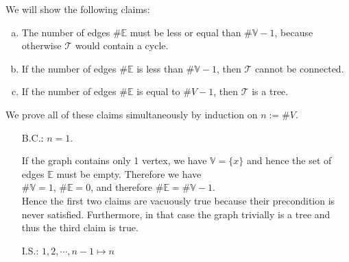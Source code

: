 \proof
We will show the following claims:
\begin{enumerate}[(a)]
\item The number of edges $\# \mathbb{E}$ must be less or equal than $\#\mathbb{V}-1$, because otherwise $\mathcal{T}$ would contain a cycle.
\item If the number of edges $\# \mathbb{E}$ is less than  $\#\mathbb{V}-1$, then $\mathcal{T}$ cannot be connected.
\item If the number of edges $\# \mathbb{E}$ is equal to $\#V - 1$, then $\mathcal{T}$ is a tree.
\end{enumerate}
We prove all of these claims simultaneously by induction on $n := \#V$.
\begin{enumerate}
\item[B.C.:] $n = 1$.

  If the graph contains only 1 vertex, we have $\mathbb{V} = \{x\}$ and hence the set of edges $\mathbb{E}$
  must be empty. Therefore we have
  \\[0.2cm]
  \hspace*{1.3cm}
  $\#\mathbb{V} = 1$, \quad $\#\mathbb{E} = 0$, \quad and therefore \quad $\#\mathbb{E} = \#\mathbb{V}-1$.
  \\[0.2cm]
  Hence the first two claims are vacuously true because their precondition is never satisfied.
  Furthermore, in that case the graph trivially is a tree and thus the third claim is true.
\item[I.S.:] $1, 2, \cdots, n-1 \mapsto n$


\end{enumerate}
